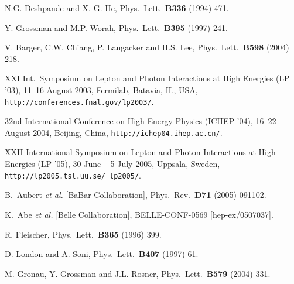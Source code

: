\documentclass[11pt]{cernrep}
\begin{document}
\begin{thebibliography}{999}
N.G. Deshpande and X.-G. He, { Phys.\ Lett.}~{\bf B336} (1994)
471.

Y. Grossman and M.P. Worah,
  { Phys.\ Lett.}~{\bf B395} (1997) 241.

V. Barger, C.W. Chiang, P. Langacker and H.S. Lee,
  { Phys.\ Lett.}~{\bf B598} (2004) 218.

XXI Int.\ Symposium on Lepton and Photon Interactions
at High Energies (LP '03), 11--16 August 2003, Fermilab, Batavia, IL, USA, 
{\tt http://conferences.fnal.gov/lp2003/}.

32nd International Conference on High-Energy Physics
(ICHEP '04), 16--22 August 2004, Beijing, China, 
{\tt http://ichep04.ihep.ac.cn/}.

XXII International Symposium on Lepton and Photon Interactions
at High Energies (LP '05), 30 June -- 5 July 2005, Uppsala, Sweden,
{\tt http://lp2005.tsl.uu.se/~lp2005/}.

B.~Aubert {\it et al.}  [BaBar Collaboration],
  { Phys.\ Rev.}~{\bf D71} (2005) 091102.

K.~Abe {\it et al.}  [Belle Collaboration],
  BELLE-CONF-0569 [hep-ex/0507037].

R. Fleischer,
 { Phys.\ Lett.}~{\bf B365} (1996) 399.

D. London and A. Soni,
  { Phys.\ Lett.}~{\bf B407} (1997) 61.

M. Gronau, Y. Grossman and J.L. Rosner,
  { Phys.\ Lett.}~{\bf B579} (2004) 331.
  

\end{thebibliography}
\end{document}
